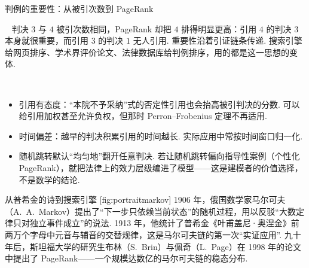 \documentclass[lang=cn,10.5pt,scheme=chinese,toc=twocol,section,chinesefont=nofont,
twoside,citestyle=gb7714-2015,bibstyle=gb7714-2015]{elegantbook}
\DeclareRobustCommand{\textbf}[1]{{\lnsemiboldlatin\lnsemiboldcjk #1}}
\numberwithin{equation}{section}   %
\newcommand{\mstep}[1]{\par\smallskip\noindent\textbf{【#1】}\ }
\begin{document}
\begin{modelbox}{判例的重要性：从被引次数到 PageRank}
\begin{center}
    \label{fig:pagerank}
  \end{center}
  \mstep{解读} 判决 $3$ 与 $4$ 被引次数相同，PageRank 却把 $4$ 排得明显更高：引用 $4$ 的判决 $3$ 本身就很重要，而引用 $3$ 的判决 $1$ 无人引用. 重要性沿着引证链条\textbf{传递}. 搜索引擎给网页排序、学术界评价论文、法律数据库给判例排序，用的都是这一思想的变体.

  \mstep{局限}
  \begin{itemize}
    \item 引用有态度：“本院不予采纳”式的否定性引用也会抬高被引判决的分数. 可以给引用加权甚至允许负权，但那时 Perron–Frobenius 定理不再适用.
    \item 时间偏差：越早的判决积累引用的时间越长. 实际应用中常按时间窗口归一化.
    \item 随机跳转默认“均匀地”翻开任意判决. 若让随机跳转偏向指导性案例（\textbf{个性化 PageRank}），就把法律上的效力层级编进了模型——这是建模者的价值选择，不是数学的结论.
  \end{itemize}
\end{modelbox}

\begin{historybox}{从普希金的诗到搜索引擎}
  [fig:portraitmarkov]
  1906 年，俄国数学家马尔可夫（A.~A.~Markov）提出了“下一步只依赖当前状态”的随机过程，用以反驳“大数定律只对独立事件成立”的说法\cite{markov1906rasprostranenie}. 1913 年，他统计了普希金《叶甫盖尼·奥涅金》前两万个字母中元音与辅音的交替规律，这是马尔可夫链的第一次“实证应用”\cite{markov1913onegin,hayes2013first}. 九十年后，斯坦福大学的研究生布林（S.~Brin）与佩奇（L.~Page）在 1998 年的论文\cite{brin1998anatomy}中提出了 PageRank——一个规模达数亿的马尔可夫链的稳态分布.
\end{historybox}
\end{document}
